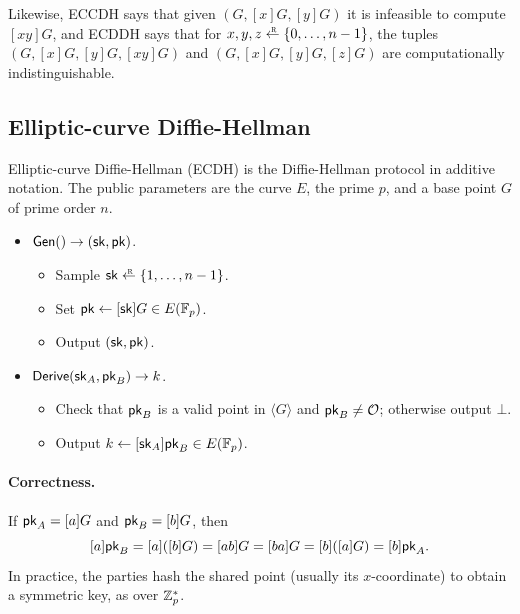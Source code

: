 Likewise, ECCDH says that given $(G, [x]G, [y]G)$ it is infeasible to
compute $[xy]G$, and ECDDH says that for $x, y, z \getsr \{0, \dots, n-1\}$,
the tuples $(G, [x]G, [y]G, [xy]G)$ and $(G, [x]G, [y]G, [z]G)$ are
computationally indistinguishable.

\subsection{Elliptic-curve Diffie-Hellman}

Elliptic-curve Diffie-Hellman (ECDH) is the Diffie-Hellman protocol in
additive notation.
The public parameters are the curve $E$, the prime $p$, and a base point
$G$ of prime order $n$.

\begin{itemize}[noitemsep]
  \item $\mathsf{Gen}() \to ({\mathsf{sk}}, \mathsf{pk})$.
    \begin{itemize}[noitemsep]
      \item Sample $\sk \getsr \{1, \dots, n-1\}$.
      \item Set $\mathsf{pk} \gets [{\mathsf{sk}}]G \in E(\mathbb{F}_p)$.
      \item Output $({\mathsf{sk}}, \mathsf{pk})$.
    \end{itemize}
  \item $\mathsf{Derive}({\mathsf{sk}}_A, \mathsf{pk}_B) \to k$.
    \begin{itemize}[noitemsep]
      \item Check that $\mathsf{pk}_B$ is a valid point in $\langle G\rangle$
            and $\mathsf{pk}_B \neq \mathcal{O}$; otherwise output $\bot$.
      \item Output $k \gets [{\mathsf{sk}}_A]\mathsf{pk}_B \in E(\mathbb{F}_p)$.
    \end{itemize}
\end{itemize}

\paragraph{Correctness.}
If $\mathsf{pk}_A = [a]G$ and $\mathsf{pk}_B = [b]G$, then
\[ [a]\mathsf{pk}_B = [a]([b]G) = [ab]G = [ba]G = [b]([a]G) = [b]\mathsf{pk}_A. \]
In practice, the parties hash the shared point (usually its
$x$-coordinate) to obtain a symmetric key, as over $\mathbb{Z}^*_p$.

